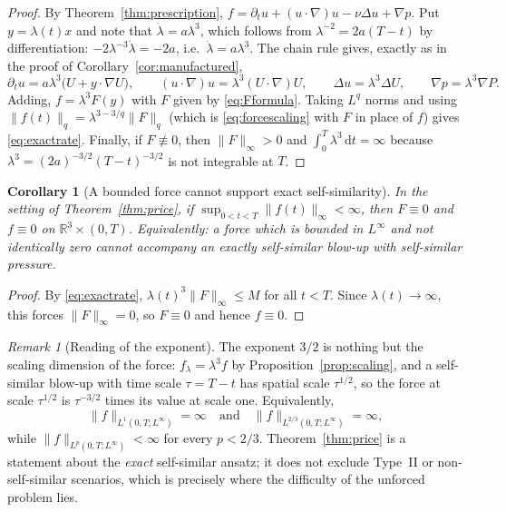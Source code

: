 \documentclass[11pt]{article}
\newtheorem{corollary}[theorem]{Corollary}
\theoremstyle{remark}
\newtheorem{remark}[theorem]{Remark}
\newcommand{\R}{\mathbb{R}}
\newcommand{\dd}{\,\mathrm{d}}
\newcommand{\norm}[1]{\lVert #1\rVert}
\begin{document}
\begin{proof}
By Theorem~\ref{thm:prescription}, $f=\partial_tu+(u\cdot\nabla)u-\nu\Delta u+\nabla p$. Put
$y=\lambda(t)x$ and note that $\dot\lambda=a\lambda^3$, which follows from
$\lambda^{-2}=2a(T-t)$ by differentiation: $-2\lambda^{-3}\dot\lambda=-2a$, i.e.\
$\dot\lambda=a\lambda^3$. The chain rule gives, exactly as in the proof of
Corollary~\ref{cor:manufactured},
\[
\partial_tu=a\lambda^3\bigl(U+y\cdot\nabla U\bigr),\qquad
(u\cdot\nabla)u=\lambda^3(U\cdot\nabla)U,\qquad
\Delta u=\lambda^3\Delta U,\qquad
\nabla p=\lambda^3\nabla P .
\]
Adding, $f=\lambda^3F(y)$ with $F$ given by \eqref{eq:Fformula}. Taking $L^q$ norms and using
$\norm{f(t)}_{q}=\lambda^{3-3/q}\norm{F}_{q}$ (which is \eqref{eq:forcescaling} with $F$ in
place of $f$) gives \eqref{eq:exactrate}. Finally, if $F\not\equiv0$, then
$\norm{F}_\infty>0$ and $\int_0^T\lambda^3\dd t=\infty$ because $\lambda^3=(2a)^{-3/2}(T-t)^{-3/2}$
is not integrable at $T$.
\end{proof}

\begin{corollary}[A bounded force cannot support exact self-similarity]\label{cor:price}
In the setting of Theorem~\ref{thm:price}, if $\sup_{0<t<T}\norm{f(t)}_{\infty}<\infty$, then
$F\equiv0$ and $f\equiv0$ on $\R^3\times(0,T)$. Equivalently: a force which is bounded in
$L^\infty$ and not identically zero cannot accompany an exactly self-similar blow-up with
self-similar pressure.
\end{corollary}

\begin{proof}
By \eqref{eq:exactrate}, $\lambda(t)^3\norm{F}_\infty\le M$ for all $t<T$. Since
$\lambda(t)\to\infty$, this forces $\norm{F}_\infty=0$, so $F\equiv0$ and hence $f\equiv0$.
\end{proof}

\begin{remark}[Reading of the exponent]\label{rem:exponent}
The exponent $3/2$ is nothing but the scaling dimension of the force: $f_\lambda=\lambda^3f$
by Proposition~\ref{prop:scaling}, and a self-similar blow-up with time scale
$\tau=T-t$ has spatial scale $\tau^{1/2}$, so the force at scale $\tau^{1/2}$ is
$\tau^{-3/2}$ times its value at scale one. Equivalently,
\[
\norm{f}_{L^1(0,T;L^\infty)}=\infty
\quad\text{and}\quad
\norm{f}_{L^{2/3}(0,T;L^\infty)}=\infty,
\]
while $\norm{f}_{L^p(0,T;L^\infty)}<\infty$ for every $p<2/3$. Theorem~\ref{thm:price} is a
statement about the \emph{exact} self-similar ansatz; it does not exclude Type~II or
non-self-similar scenarios, which is precisely where the difficulty of the unforced problem
lies.
\end{remark}
\end{document}
